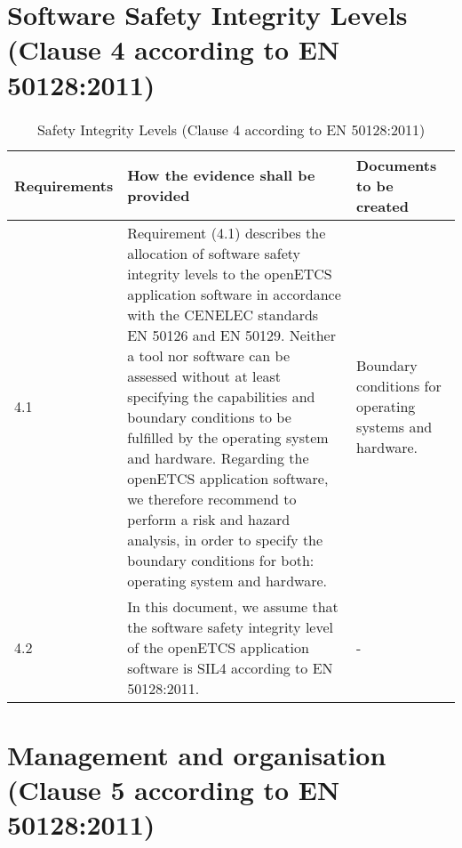 \documentclass{template/openetcs_report}
\begin{document}

\section{Software Safety Integrity Levels (Clause 4 according to EN 50128:2011)}
\label{clause42}
{\footnotesize\sffamily\centering
\begin{longtable}{|p{2cm}|p{9cm}|p{3cm}|}
\caption{Safety Integrity Levels (Clause 4 according to EN 50128:2011)}\\
\hline
\bfseries Requirements & \bfseries How the evidence shall be provided & \bfseries Documents to be created\\
\hline
\hline
\endhead
\hline
\endfoot

4.1 & Requirement (4.1) describes the allocation of software safety integrity levels to the openETCS application software in accordance with the CENELEC standards EN 50126 and EN 50129.
\linebreak
\linebreak
Neither a tool nor software can be assessed without at least specifying the capabilities and boundary conditions to be fulfilled by the operating system and hardware. 
\linebreak
\linebreak
Regarding the openETCS application software, we therefore recommend to perform a risk and hazard analysis, in order to specify the boundary conditions for both: operating system and hardware.
& Boundary conditions for operating systems and hardware.\\ 
\hline
4.2 & In this document, we assume that the software safety integrity level of the openETCS application software is SIL4 according to EN 50128:2011.
& - \\ 
\hline
\end{longtable}}


\section{Management and organisation (Clause 5 according to EN 50128:2011)}
\label{clause52}
\end{document}
